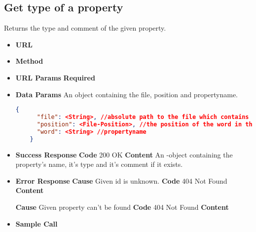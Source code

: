\subsection{Get type of a property}
Returns the type and comment of the given property.
\begin{itemize}
\item \textbf{URL} 
\item \textbf{Method} 

\item \textbf{URL Params}
  \newline\textbf{Required} 

\item \textbf{Data Params} An object containing the file, position and propertyname.
    \begin{lstlisting}[basicstyle=\small,language=json]
    {
      "file": <String>, //absolute path to the file which contains the word/symbol
      "position": <File-Position>, //the position of the word in the file
      "word": <String> //propertyname
    }
  \end{lstlisting}

\item \textbf{Success Response}
  \newline\textbf{Code} 200 OK
  \newline\textbf{Content} An -object containing the property's name,
  it's type and it's comment if it exists.
  
\item \textbf{Error Response}
  \newline\textbf{Cause} Given id is unknown.
  \newline\textbf{Code} 404 Not Found
  \newline\textbf{Content} 

  \fixedspace\textbf{Cause} Given property can't be found
  \newline\textbf{Code} 404 Not Found
  \newline\textbf{Content} 

\item \textbf{Sample Call}
\end{itemize}
